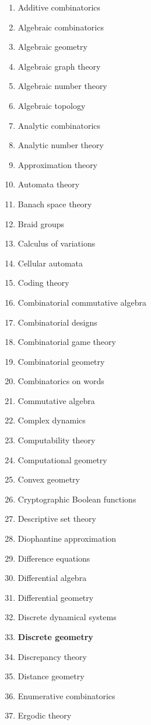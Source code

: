 \begin{enumerate}[label=\arabic*.,itemsep=0pt,topsep=0pt,leftmargin=2.7em]
\item Additive combinatorics
\item Algebraic combinatorics
\item Algebraic geometry
\item Algebraic graph theory
\item Algebraic number theory
\item Algebraic topology
\item Analytic combinatorics
\item Analytic number theory
\item Approximation theory
\item Automata theory
\item Banach space theory
\item Braid groups
\item Calculus of variations
\item Cellular automata
\item Coding theory
\item Combinatorial commutative algebra
\item Combinatorial designs
\item Combinatorial game theory
\item Combinatorial geometry
\item Combinatorics on words
\item Commutative algebra
\item Complex dynamics
\item Computability theory
\item Computational geometry
\item Convex geometry
\item Cryptographic Boolean functions
\item Descriptive set theory
\item Diophantine approximation
\item Difference equations
\item Differential algebra
\item Differential geometry
\item Discrete dynamical systems
\item \textbf{Discrete geometry}
\item Discrepancy theory
\item Distance geometry
\item Enumerative combinatorics
\item Ergodic theory

\end{enumerate}
